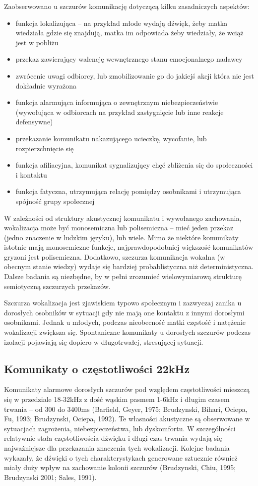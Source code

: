 \documentclass{psychol}
\begin{document}
Zaobserwowano u szczurów komunikację dotyczącą kilku zasadniczych aspektów:
\begin{itemize}
    \item funkcja lokalizująca -- na przykład młode wydają dźwięk, żeby matka wiedziała gdzie się znajdują, matka im odpowiada żeby wiedziały, że wciąż jest w pobliżu
    \item przekaz zawierający walencję wewnętrznego stanu emocjonalnego nadawcy
    \item zwrócenie uwagi odbiorcy, lub zmobilizowanie go do jakiejś akcji która nie jest dokładnie wyrażona
    \item funkcja alarmująca informująca o zewnętrznym niebezpieczeństwie (wywołująca w odbiorcach na przykład zastygnięcie lub inne reakcje defensywne)
    \item przekazanie komunikatu nakazującego ucieczkę, wycofanie, lub rozpierzchnięcie się
    \item funkcja afiliacyjna, komunikat sygnalizujący chęć zbliżenia się do społeczności i kontaktu
    \item funkcja fatyczna, utrzymująca relację pomiędzy osobnikami i utrzymująca spójność grupy społecznej
\end{itemize}

W zależności od struktury akustycznej komunikatu i wywołanego zachowania, wokalizacja może być monosemiczna lub polisemiczna -- mieć jeden przekaz (jedno znaczenie w ludzkim języku), lub wiele. Mimo że niektóre komunikaty istotnie mają monosemiczne funkcje, najprawdopodobniej większość komunikatów gryzoni jest polisemiczna. Dodatkowo, szczurza komunikacja wokalna (w obecnym stanie wiedzy) wydaje się bardziej probablistyczna niż deterministyczna. Dalsze badania są niezbędne, by w pełni zrozumieć wielowymiarową strukturę semiotyczną szczurzych przekazów.

Szczurza wokalizacja jest zjawiskiem typowo społecznym i zazwyczaj zanika u dorosłych osobników w sytuacji gdy nie mają one kontaktu z innymi dorosłymi osobnikami. Jednak u młodych, podczas nieobecność matki częstość i natężenie wokalizacji zwiększa się. Spontaniczne komunikaty u dorosłych szczurów podczas izolacji pojawiają się dopiero w długotrwałej, stresującej sytuacji.

\subsection{Komunikaty o częstotliwości 22kHz}

Komunikaty alarmowe dorosłych szczurów pod względem częstotliwości mieszczą się w przedziale 18-32kHz z dość wąskim pasmem 1-6kHz i długim czasem trwania -- od 300 do 3400ms (Barfield, Geyer, 1975; Brudzynski, Bihari, Ociepa, Fu, 1993; Brudzynski, Ociepa, 1992). Te własności akustyczne są obserwowane w sytuacjach zagrożenia, niebezpieczeństwa, lub dyskomfortu. W szczególności relatywnie stała częstotliwościa dźwięku i długi czas trwania wydają się najważniejsze dla przekazania znaczenia tych wokalizacji. Kolejne badania wykazały, że dźwięki o tych charakterystykach generowane sztucznie również miały duży wpływ na zachowanie kolonii szczurów (Brudzynski, Chiu, 1995; Brudzynski 2001; Sales, 1991).
\end{document}
